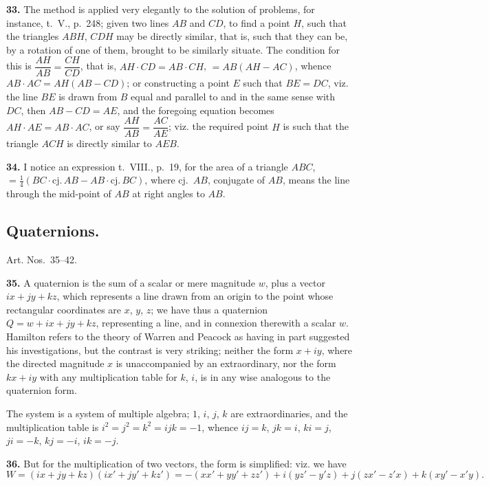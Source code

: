 \documentclass[11pt,a4paper]{article}
\theoremstyle{definition}
\begin{document}
\textbf{33.} The method is applied very elegantly to the solution of problems, for instance, t.~V., p.~248; given two lines $AB$ and $CD$, to find a point $H$, such that the triangles $ABH$, $CDH$ may be directly similar, that is, such that they can be, by a rotation of one of them, brought to be similarly situate. The condition for this is $\dfrac{AH}{AB} = \dfrac{CH}{CD}$, that is, $AH \cdot CD = AB \cdot CH$, $= AB(AH - AC)$, whence $AB \cdot AC = AH(AB - CD)$; or constructing a point $E$ such that $BE = DC$, viz. the line $BE$ is drawn from $B$ equal and parallel to and in the same sense with $DC$, then $AB - CD = AE$, and the foregoing equation becomes $AH \cdot AE = AB \cdot AC$, or say $\dfrac{AH}{AB} = \dfrac{AC}{AE}$; viz. the required point $H$ is such that the triangle $ACH$ is directly similar to $AEB$.

\textbf{34.} I notice an expression t.~VIII., p.~19, for the area of a triangle $ABC$, $= \tfrac{1}{4}(BC \cdot \text{cj.}\, AB - AB \cdot \text{cj.}\, BC)$, where cj.\ $AB$, conjugate of $AB$, means the line through the mid-point of $AB$ at right angles to $AB$.

\subsection*{Quaternions.}

Art. Nos.~35--42.

\textbf{35.} A quaternion is the sum of a scalar or mere magnitude $w$, plus a vector $ix + jy + kz$, which represents a line drawn from an origin to the point whose rectangular coordinates are $x$, $y$, $z$; we have thus a quaternion $Q = w + ix + jy + kz$, representing a line, and in connexion therewith a scalar $w$. Hamilton refers to the theory of Warren and Peacock as having in part suggested his investigations, but the contrast is very striking; neither the form $x + iy$, where the directed magnitude $x$ is unaccompanied by an extraordinary, nor the form $kx + iy$ with any multiplication table for $k$, $i$, is in any wise analogous to the quaternion form.

The system is a system of multiple algebra; $1$, $i$, $j$, $k$ are extraordinaries, and the multiplication table is $i^2 = j^2 = k^2 = ijk = -1$, whence $ij = k$, $jk = i$, $ki = j$, $ji = -k$, $kj = -i$, $ik = -j$.

\textbf{36.} But for the multiplication of two vectors, the form is simplified: viz. we have
\[
W = (ix + jy + kz)(ix' + jy' + kz') = -(xx' + yy' + zz') + i(yz' - y'z) + j(zx' - z'x) + k(xy' - x'y).
\]
\end{document}
